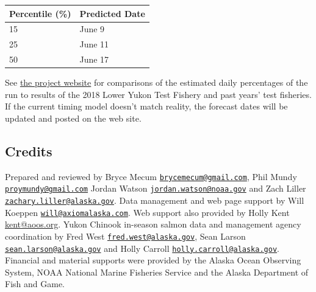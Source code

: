 \documentclass[]{article}
\begin{document}
\begin{longtable}[]{@{}ll@{}}
\toprule
Percentile (\%) & Predicted Date\tabularnewline
\midrule
\endhead
15 & June 9\tabularnewline
25 & June 11\tabularnewline
50 & June 17\tabularnewline
\bottomrule
\end{longtable}

See
\href{http://www.aoos.org/2018-run-timing-outlook-and-forecast-summary-chinook-salmon-yukon-river-delta/}{the
project website} for comparisons of the estimated daily percentages of
the run to results of the 2018 Lower Yukon Test Fishery and past years'
test fisheries. If the current timing model doesn't match reality, the
forecast dates will be updated and posted on the web site.

\hypertarget{credits}{%
\subsection{Credits}\label{credits}}

Prepared and reviewed by Bryce Mecum
\href{mailto:brycemecum@gmail.com}{\nolinkurl{brycemecum@gmail.com}},
Phil Mundy
\href{mailto:proymundy@gmail.com}{\nolinkurl{proymundy@gmail.com}}
Jordan Watson
\href{mailto:jordan.watson@noaa.gov}{\nolinkurl{jordan.watson@noaa.gov}}
and Zach Liller
\href{mailto:zachary.liller@alaska.gov}{\nolinkurl{zachary.liller@alaska.gov}}.
Data management and web page support by Will Koeppen
\href{mailto:will@axiomalaska.com}{\nolinkurl{will@axiomalaska.com}}.
Web support also provided by Holly Kent
\href{mailto:\%20kent@aoos.org}{kent@aoos.org}. Yukon Chinook in-season
salmon data and management agency coordination by Fred West
\href{mailto:fred.west@alaska.gov}{\nolinkurl{fred.west@alaska.gov}},
Sean Larson
\href{mailto:sean.larson@alaska.gov}{\nolinkurl{sean.larson@alaska.gov}}
and Holly Carroll
\href{mailto:holly.carroll@alaska.gov}{\nolinkurl{holly.carroll@alaska.gov}}.
Financial and material supports were provided by the Alaska Ocean
Observing System, NOAA National Marine Fisheries Service and the Alaska
Department of Fish and Game.
\end{document}
